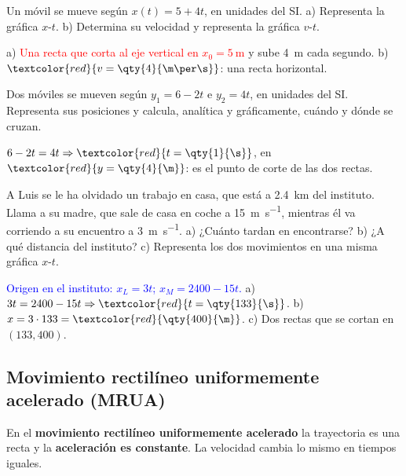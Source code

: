 \begin{exercise}
    Un móvil se mueve según \(x(t) = 5 + 4t\), en unidades del SI. a) Representa la gráfica \(x\)-\(t\). b) Determina su velocidad
    y representa la gráfica \(v\)-\(t\).
    \begin{solu}
        a) \textcolor{red}{Una recta que corta al eje vertical en \(x_0 = \qty{5}{\m}\)} y sube \qty{4}{\m} cada segundo.
        b) \(\textcolor{red}{v = \qty{4}{\m\per\s}}\): una recta horizontal.
    \end{solu}
\end{exercise}

\begin{exercise}
    Dos móviles se mueven según \(y_1 = 6 - 2t\) e \(y_2 = 4t\), en unidades del SI. Representa sus posiciones y calcula, analítica
    y gráficamente, cuándo y dónde se cruzan.
    \begin{solu}
        \(6 - 2t = 4t \Rightarrow \textcolor{red}{t = \qty{1}{\s}}\), en \(\textcolor{red}{y = \qty{4}{\m}}\): es el punto de corte de
        las dos rectas.
    \end{solu}
\end{exercise}

\begin{exercise}
    A Luis se le ha olvidado un trabajo en casa, que está a \qty{2.4}{\km} del instituto. Llama a su madre, que sale de casa en
    coche a \qty{15}{\m\per\s}, mientras él va corriendo a su encuentro a \qty{3}{\m\per\s}. a) ¿Cuánto tardan en encontrarse?
    b) ¿A qué distancia del instituto? c) Representa los dos movimientos en una misma gráfica \(x\)-\(t\).
    \begin{solu}
        \textcolor{blue}{Origen en el instituto: \(x_L = 3t\); \(x_M = 2400 - 15t\).} a) \(3t = 2400 - 15t \Rightarrow
        \textcolor{red}{t = \qty{133}{\s}}\). b) \(x = 3 \cdot 133 = \textcolor{red}{\qty{400}{\m}}\). c) Dos rectas que se cortan en
        \((133, 400)\).
    \end{solu}
\end{exercise}

\subsection{Movimiento rectilíneo uniformemente acelerado (MRUA)}

\begin{definition}[MRUA]
    En el \textbf{movimiento rectilíneo uniformemente acelerado} la trayectoria es una recta y la \textbf{aceleración es
    constante}. La velocidad cambia lo mismo en tiempos iguales.
\end{definition}

